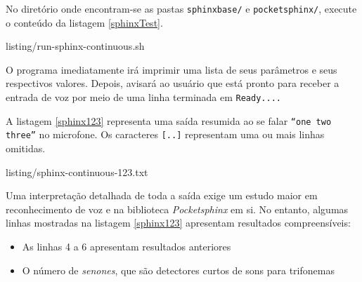 No diretório onde encontram-se as pastas \texttt{sphinxbase/} e \texttt{pocketsphinx/}, execute o conteúdo da listagem \ref{sphinxTest}.


  {listing/run-sphinx-continuous.sh}

O programa imediatamente irá imprimir uma lista de seus parâmetros e seus respectivos valores. Depois, avisará ao usuário que está pronto para receber a entrada de voz por meio de uma linha terminada em \texttt{Ready....}

A listagem \ref{sphinx123} representa uma saída resumida ao se falar \texttt{``one two three''} no microfone. Os caracteres \texttt{[..]} representam uma ou mais linhas omitidas.


  {listing/sphinx-continuous-123.txt}

Uma interpretação detalhada de toda a saída exige um estudo maior em reconhecimento de voz e na biblioteca \textit{Pocketsphinx} em si. No entanto, algumas linhas mostradas na listagem \ref{sphinx123} apresentam resultados compreensíveis:

\begin{itemize}
\item As linhas 4 a 6 apresentam resultados anteriores
\item O número de \textit{senones}, que são detectores curtos de sons para trifonemas
\end{itemize}
